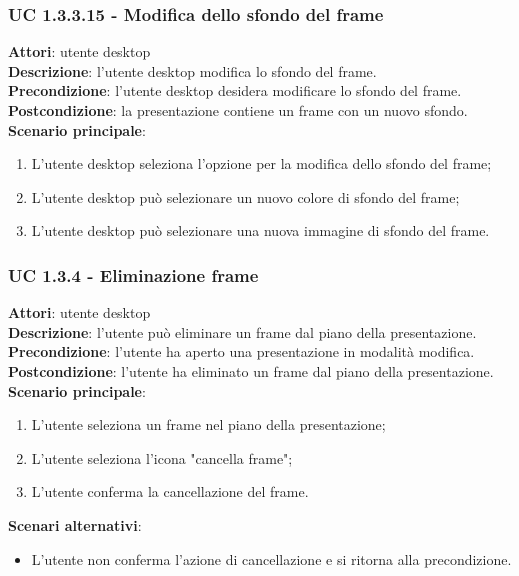 \subsubsection{UC 1.3.3.15 - Modifica dello sfondo del frame}{
	\label{uc1.3.3.15}
	\textbf{Attori}: utente desktop \\
	\textbf{Descrizione}: l'utente desktop modifica lo sfondo del frame. \\
	\textbf{Precondizione}: l'utente desktop desidera modificare lo sfondo del frame.	\\
	\textbf{Postcondizione}: la presentazione contiene un frame con un nuovo sfondo.	\\
	\textbf{Scenario principale}:
	\begin{enumerate}
		\item L'utente desktop seleziona l'opzione per la modifica dello sfondo del frame;
		\item L'utente desktop può selezionare un nuovo colore di sfondo del frame;
		\item L'utente desktop può selezionare una nuova immagine di sfondo del frame.
	\end{enumerate}
	}
\subsubsection{UC 1.3.4 - Eliminazione frame}{
	\label{uc1.3.4}
	\textbf{Attori}: utente desktop \\
	\textbf{Descrizione}: l'utente può eliminare un frame dal piano della presentazione. \\
	\textbf{Precondizione}: l'utente ha aperto una presentazione in modalità modifica.	\\
	\textbf{Postcondizione}: l'utente ha eliminato un frame dal piano della presentazione.	\\
	\textbf{Scenario principale}:
	\begin{enumerate}
		\item L'utente seleziona un frame nel piano della presentazione;
		\item L'utente seleziona l'icona "cancella frame";
		\item L'utente conferma la cancellazione del frame.
	\end{enumerate}
	\textbf{Scenari alternativi}: 
	\begin{itemize}
		\item L'utente non conferma l'azione di cancellazione e si ritorna alla precondizione.
	\end{itemize}
}
